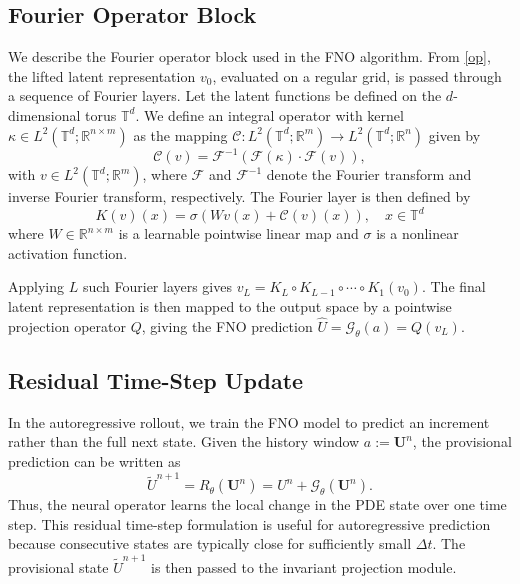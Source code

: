 \documentclass[11pt,a4paper]{article}
\theoremstyle{definition}
\theoremstyle{remark}
\numberwithin{equation}{section}
\numberwithin{figure}{section}
\numberwithin{table}{section}
\begin{document}
\subsection{Fourier Operator Block}
\label{subsec:fourier_operator_block}

We describe the Fourier operator block used in the FNO algorithm. From \eqref{op}, the lifted latent representation \(v_0\), evaluated on a regular grid, is passed through a sequence of Fourier layers. Let the latent functions be defined on the \(d\)-dimensional torus \(\mathbb T^d\). We define an integral operator with kernel
\(\kappa \in L^2(\mathbb T^d;\mathbb R^{n\times m})\) as the mapping
\(\mathcal C:L^2(\mathbb T^d;\mathbb R^m)\to L^2(\mathbb T^d;\mathbb R^n)\)
given by
\[
    \mathcal C(v)=\mathcal F^{-1}\left(\mathcal F(\kappa)\cdot \mathcal F(v)\right),
\]
with \(v\in L^2(\mathbb T^d;\mathbb R^m)\), where \(\mathcal F\) and \(\mathcal F^{-1}\) denote the Fourier transform and inverse Fourier transform, respectively. 
The Fourier layer is then defined by
\[
    K(v)(x)=\sigma\left(Wv(x)+\mathcal C(v)(x)\right), \quad x\in\mathbb T^d
\]
where \(W\in\mathbb R^{n\times m}\) is a learnable pointwise linear map and
\(\sigma\) is a nonlinear activation function.

Applying \(L\) such Fourier layers gives
\(v_L=K_L\circ K_{L-1}\circ \cdots \circ K_1(v_0)\).
The final latent representation is then mapped to the output space by a
pointwise projection operator \(Q\), giving the FNO prediction
\(\widehat U=\mathcal G_\theta(a)=Q(v_L)\).

\subsection{Residual Time-Step Update}
\label{subsec:residual_time_update}

In the autoregressive rollout, we train the FNO model to predict an increment rather than the full next state. Given the history window
\(a:=\mathbf U^n\), the provisional prediction can be written as
\[
    \widetilde U^{n+1} = R_\theta(\mathbf U^n) = U^n+\mathcal G_\theta(\mathbf U^n).
\]
Thus, the neural operator learns the local change in the PDE state over one
time step. This residual time-step formulation is useful for autoregressive
prediction because consecutive states are typically close for sufficiently
small \(\Delta t\). The provisional state \(\widetilde U^{n+1}\) is then passed to the invariant
projection module.
\end{document}
